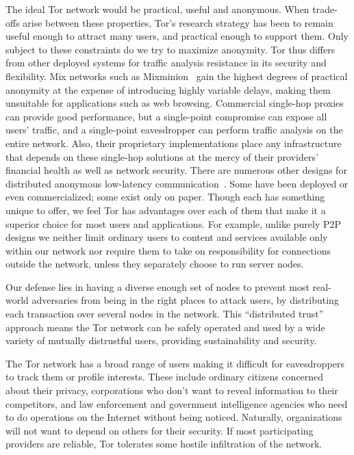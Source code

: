\documentclass{llncs}
\begin{document}
The ideal Tor network would be practical, useful and anonymous. When
trade-offs arise between these properties, Tor's research strategy has
been to remain useful enough to attract many users, and practical
enough to support them.  Only subject to these constraints do we try
to maximize anonymity.  Tor thus differs from other deployed systems
for traffic analysis resistance in its security and flexibility.  Mix
networks such as
Mixminion~\cite{minion-design} gain the highest degrees of practical
anonymity at the expense of introducing highly variable delays, making
them unsuitable for applications such as web browsing.  Commercial
single-hop proxies~\cite{anonymizer} can provide good performance, but
a single-point compromise can expose all users' traffic, and a
single-point eavesdropper can perform traffic analysis on the entire
network.  Also, their proprietary implementations place any
infrastructure that depends on these single-hop solutions at the mercy
of their providers' financial health as well as network security.
There are numerous other designs for distributed anonymous low-latency
communication~\cite{crowds-tissec,web-mix,freedom21-security,i2p,tarzan:ccs02,morphmix:fc04}.
Some have been deployed or even commercialized; some exist only on
paper. Though each has something unique to offer, we feel Tor has
advantages over each of them that make it a superior choice for most
users and applications. For example, unlike purely P2P designs we
neither limit ordinary users to content and services available only
within our network nor require them to take on responsibility for
connections outside the network, unless they separately choose to run
server nodes.

Our defense lies in having a diverse enough set of nodes to prevent
most real-world adversaries from being in the right places to attack
users, by distributing each transaction over several nodes in the
network.  This ``distributed trust'' approach means the Tor network
can be safely operated and used by a wide variety of mutually
distrustful users, providing sustainability and security.

The Tor network has a broad range of users making it difficult for
eavesdroppers to track them or profile interests. These include
ordinary citizens concerned about their privacy, corporations who
don't want to reveal information to their competitors, and law
enforcement and government intelligence agencies who need to do
operations on the Internet without being noticed.  Naturally,
organizations will not want to depend on others for their security.
If most participating providers are reliable, Tor tolerates some
hostile infiltration of the network.
\end{document}

